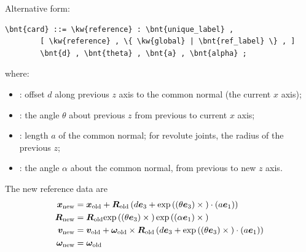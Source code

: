 Alternative form:
\begin{Verbatim}[commandchars=\\\{\}]
    \bnt{card} ::= \kw{reference} : \bnt{unique_label} , 
        [ \kw{reference} , \{ \kw{global} | \bnt{ref_label} \} , ]
        \bnt{d} , \bnt{theta} , \bnt{a} , \bnt{alpha} ;
\end{Verbatim}
where:
\begin{itemize}
\item {}: offset $d$ along previous $z$ axis to the common normal (the current $x$ axis);

\item {}: the angle $\theta$ about previous $z$ from previous to current $x$ axis;

\item {}: length $a$ of the common normal; for revolute joints, the radius of the previous $z$;

\item {}: the angle $\alpha$ about the common normal, from previous to new $z$ axis.
\end{itemize}
The new reference data are
\begin{subequations}
\begin{align}
	\boldsymbol{x}_\text{new}
	&=
	\boldsymbol{x}_\text{old}
	+
	\boldsymbol{R}_\text{old} \left( 
		d \boldsymbol{e}_3
		+
		\text{exp}\left( \left( \theta \boldsymbol{e}_3 \right) \times{} \right) \cdot \left( a \boldsymbol{e}_1 \right)
	 \right)
	\\
	\boldsymbol{R}_\text{new}
	&=
	\boldsymbol{R}_\text{old} \text{exp}\left( \left( \theta \boldsymbol{e}_3 \right) \times{} \right) \text{exp}\left( \left( \alpha \boldsymbol{e}_1 \right) \times{} \right)
	\\
	\boldsymbol{v}_\text{new}
	&=
	\boldsymbol{v}_\text{old}
	+
	\boldsymbol{\omega}_\text{old} \times \boldsymbol{R}_\text{old} \left( 
		d \boldsymbol{e}_3
		+
		\text{exp}\left( \left( \theta \boldsymbol{e}_3 \right) \times{} \right) \cdot \left( a \boldsymbol{e}_1 \right)
	 \right)
	\\
	\boldsymbol{\omega}_\text{new}
	&=
	\boldsymbol{\omega}_\text{old}
\end{align}
\end{subequations}

